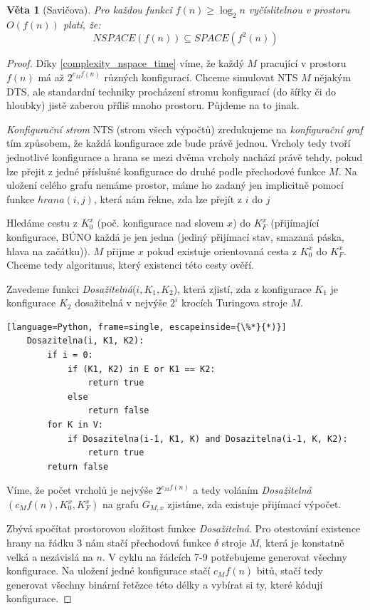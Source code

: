 \documentclass[11pt]{report} %
\newtheorem{theorem}{Věta}[section]
\numberwithin{equation}{section}
\begin{document}
\begin{theorem}[Savičova]
Pro každou funkci $f(n) \geq \log_2n$ vyčíslitelnou v prostoru $O(f(n))$ platí, že:
	$$NSPACE(f(n)) \subseteq SPACE(f^2(n))$$
\end{theorem}
\begin{proof}
Díky \ref{complexity_nspace_time} víme, že každý $M$ pracující v prostoru $f(n)$ má až $2^{c_Mf(n)}$ různých konfigurací. Chceme simulovat NTS $M$ nějakým DTS, ale standardní techniky procházení stromu konfigurací (do šířky či do hloubky) jistě zaberou příliš mnoho prostoru. Půjdeme na to jinak.

\textit{Konfigurační strom} NTS (strom všech výpočtů) zredukujeme na \textit{konfigurační graf} tím způsobem, že každá konfigurace zde bude právě jednou. Vrcholy tedy tvoří jednotlivé konfigurace a hrana se mezi dvěma vrcholy nachází právě tehdy, pokud lze přejit z jedné příslušné konfigurace do druhé podle přechodové funkce $M$. Na uložení celého grafu nemáme prostor, máme ho zadaný jen implicitně pomocí funkce $hrana(i,j)$, která nám řekne, zda lze přejít z $i$ do $j$

Hledáme cestu z $K_0^x$ (poč. konfigurace nad slovem $x$) do $K_F^x$ (přijímající konfigurace, BÚNO každá je jen jedna (jediný přijímací stav, smazaná páska, hlava na začátku)). $M$ přijme $x$ pokud existuje orientovaná cesta z $K_0^x$ do $K_F^x$. Chceme tedy algoritmus, který existenci této cesty ověří. 

Zavedeme funkci \textit{Dosažitelná}($i,K_1,K_2$), která zjistí, zda z konfigurace $K_1$ je konfigurace $K_2$ dosažitelná
v nejvýše $2^i$ krocích Turingova stroje $M$.
\bigskip

\begin{minipage}{\linewidth}
	\begin{lstlisting}[language=Python, frame=single, escapeinside={\%*}{*)}]
	Dosazitelna(i, K1, K2):
		if i = 0:
			if (K1, K2) in E or K1 == K2:
				return true
			else
				return false
		for K in V:
			if Dosazitelna(i-1, K1, K) and Dosazitelna(i-1, K, K2):
				return true
		return false
	\end{lstlisting}
\end{minipage}

Víme, že počet vrcholů je nejvýše $2^{c_Mf(n)}$ a tedy voláním \textit{Dosažitelná}$(c_Mf(n), K_0^x, K_F^x)$ na grafu $G_{M,x}$ zjistíme, zda existuje přijímací výpočet.

Zbývá spočítat prostorovou složitost funkce \textit{Dosažitelná}. Pro otestování existence hrany na řádku 3 nám stačí přechodová funkce $\delta$ stroje $M$, která je konstatně velká a nezávislá na $n$. V cyklu na řádcích 7-9 potřebujeme generovat všechny konfigurace. Na uložení jedné konfigurace stačí $c_Mf(n)$ bitů, stačí tedy generovat všechny binární řetězce této délky a vybírat si ty, které kódují konfigurace.


\end{proof}
\end{document}
